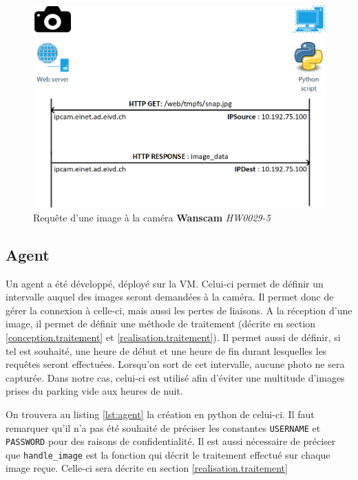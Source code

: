 \begin{figure}[H]
    \includegraphics[width=130mm]{img/realisation/cam_request.png}
    \centering
    \caption{Requête d'une image à la caméra \textbf{Wanscam} \textit{HW0029-5}}
    \label{fig:image_request}
\end{figure} 

\subsection{Agent}
Un agent a été développé, déployé sur la VM. Celui-ci permet de définir un intervalle auquel des images seront demandées à la caméra. Il permet donc de gérer la connexion à celle-ci, mais aussi les pertes de liaisons. A la réception d'une image, il permet de définir une méthode de traitement (décrite en section \ref{conception.traitement} et \ref{realisation.traitement}). 
Il permet aussi de définir, si tel est souhaité, une heure de début et une heure de fin durant lesquelles les requêtes seront effectuées. Lorsqu'on sort de cet intervalle, aucune photo ne sera capturée. Dans notre cas, celui-ci est utilisé afin d'éviter une multitude d'images prises du parking vide aux heures de nuit.

On trouvera au listing \ref{lst:agent} la création en python de celui-ci. Il faut remarquer qu'il n'a pas été souhaité de préciser les constantes \lstinline[columns=fixed]{USERNAME} et \lstinline[columns=fixed]{PASSWORD} pour des raisons de confidentialité. Il est aussi nécessaire de préciser que \lstinline[columns=fixed]{handle_image} est la fonction qui décrit le traitement effectué sur chaque image reçue. Celle-ci sera décrite en section \ref{realisation.traitement}

